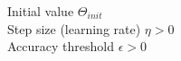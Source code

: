 \documentclass[preview]{standalone}
\begin{document}
Initial value $\Theta_{init}$\\Step size (learning rate) $\eta > 0$\\Accuracy threshold $\epsilon > 0$\\
\end{document}
